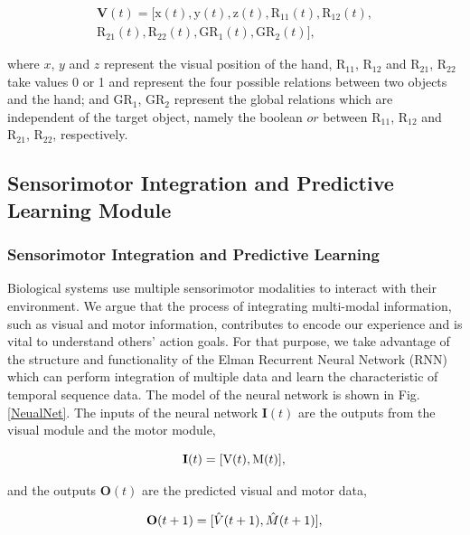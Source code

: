 \documentclass[conference]{IEEEtran}
\begin{document}
\begin{equation}
\begin{split}
	\textbf{V}(t)=[\text{x}(t), \text{y}(t), \text{z}(t), \text{R}_{11}(t), \text{R}_{12}(t),\\ \text{R}_{21}(t), \text{R}_{22}(t), \text{GR}_{1}(t), \text{GR}_{2}(t)],
\end{split}
\end{equation}

where $x$, $y$ and $z$ represent the visual position of the hand, \(\text{R}_{11}\), \(\text{R}_{12}\) and \(\text{R}_{21}\), \(\text{R}_{22}\) take values 0 or 1 and represent the four possible relations between two objects and the hand; and \(\text{GR}_{1}\), \(\text{GR}_{2}\) represent the global relations which are independent of the target object, namely the boolean $or$ between \(\text{R}_{11}\), \(\text{R}_{12}\) and \(\text{R}_{21}\), \(\text{R}_{22}\), respectively.

\subsection{Sensorimotor Integration and Predictive Learning Module}
\subsubsection{Sensorimotor Integration and Predictive Learning}
Biological systems use multiple sensorimotor modalities to interact with their environment. We argue that the process of integrating multi-modal information, such as visual and motor information, contributes to encode our experience and is vital to understand others' action goals. For that purpose, we take advantage of the structure and functionality of the Elman Recurrent Neural Network (RNN) \cite{elman1990finding} which can perform integration of multiple data and learn the characteristic of temporal sequence data. The model of the neural network is shown in Fig. \ref{NeualNet}. The inputs of the neural network \(\textbf{I}(t)\) are the outputs from the visual module and the motor module,

\begin{equation}
	\textbf{I}(t)=[\text{V}(t), \text{M}(t)],\\
\end{equation}

and the outputs \(\textbf{O}(t)\) are the predicted visual and motor data,


\begin{equation}
	\textbf{O}(t+1)=[\hat{V}(t+1), \hat{M}(t+1)],\\
\end{equation}
\end{document}
